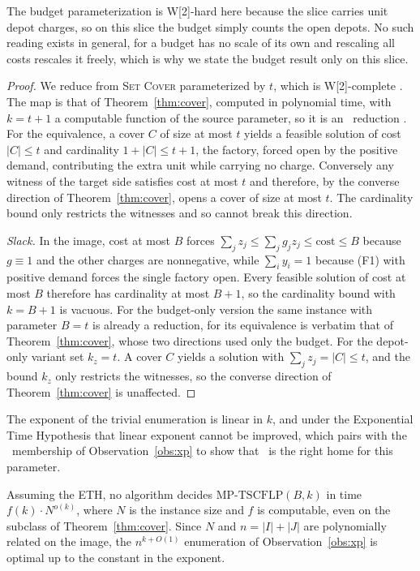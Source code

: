 The budget parameterization is W[2]-hard here because the slice carries
unit depot charges, so on this slice the budget simply counts the open
depots. No such reading exists in general, for a budget has no scale
of its own and rescaling all costs rescales it freely, which is why we
state the budget result only on this slice.

\begin{proof}
We reduce from \textsc{Set Cover} parameterized
by $t$, which is W[2]-complete \citep{DowneyFellows2013}. The map is
that of Theorem~\ref{thm:cover},
computed in polynomial time, with $k=t+1$ a computable function of the
source parameter, so it is an \FPT\ reduction
\citep{DowneyFellows2013,Cygan2015}. For the equivalence, a cover $C$ of
size at most $t$ yields a feasible solution of cost $|C|\le t$ and
cardinality $1+|C|\le t+1$, the factory, forced open by the positive
demand, contributing the extra unit while carrying no charge. Conversely
any witness of the target side
satisfies cost at most $t$ and therefore, by the converse direction of
Theorem~\ref{thm:cover}, opens a cover of size at most $t$. The
cardinality bound only restricts the witnesses and so cannot break this
direction.

\emph{Slack.} In the image, cost at most $B$ forces
$\sum_j z_j\le\sum_j g_j z_j\le\text{cost}\le B$ because $g\equiv 1$ and
the other charges are nonnegative, while $\sum_i y_i=1$ because (F1)
with positive demand forces the single factory open. Every feasible
solution of cost at most $B$ therefore has cardinality at most $B+1$, so
the cardinality bound with $k=B+1$ is vacuous. For the budget-only version
the same instance with parameter $B=t$ is already a reduction, for its
equivalence is verbatim that of Theorem~\ref{thm:cover}, whose two
directions used only the budget. For the depot-only variant set
$k_z=t$. A cover $C$ yields a solution with $\sum_j z_j=|C|\le t$, and
the bound $k_z$ only restricts the witnesses, so the converse direction
of Theorem~\ref{thm:cover} is unaffected.
\end{proof}

The exponent of the trivial enumeration is linear in $k$, and under the
Exponential Time Hypothesis \citep{ImpagliazzoPaturiZane2001} that linear
exponent cannot be improved,
which pairs with the \XP\ membership of Observation~\ref{obs:xp} to show
that \XP\ is the right home for this parameter.

\begin{theorem}\label{thm:eth}
Assuming the ETH, no algorithm decides
$\mathrm{MP\text{-}TSCFLP}(B,k)$
in time $f(k)\cdot N^{o(k)}$, where $N$ is the instance size and $f$ is
computable, even on the subclass of Theorem~\ref{thm:cover}. Since $N$
and $n=|I|+|J|$ are polynomially related on the image, the $n^{k+O(1)}$
enumeration of Observation~\ref{obs:xp} is optimal up to the constant in
the exponent.
\end{theorem}

